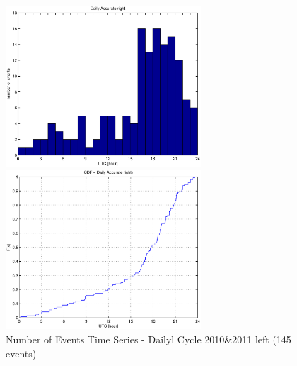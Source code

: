 \documentclass[a4paper,11pt]{article}
\begin{document}
\begin{figure}[htbp]
\begin{minipage}{0.55\hsize}
\centering
\includegraphics[width=7.3cm, clip]{histTimeDailyL.eps}
\end{minipage}
\begin{minipage}{0.55\hsize}
 \centering
\includegraphics[width=7.3cm, clip]{CDFTimeDailyL.eps}
\end{minipage}
\caption{Number of Events Time Series - Dailyl Cycle 2010\&2011 left (145 events)}
\end{figure}
\end{document}
